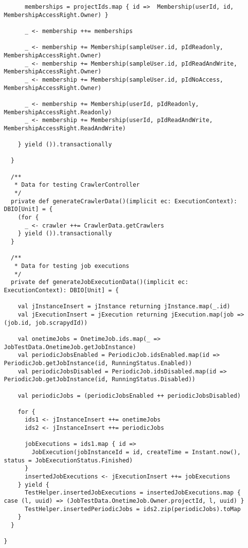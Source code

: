 \begin{lstlisting}
      memberships = projectIds.map { id =>  Membership(userId, id, MembershipAccessRight.Owner) }

      _ <- membership ++= memberships

      _ <- membership += Membership(sampleUser.id, pIdReadonly, MembershipAccessRight.Owner)
      _ <- membership += Membership(sampleUser.id, pIdReadAndWrite, MembershipAccessRight.Owner)
      _ <- membership += Membership(sampleUser.id, pIdNoAccess, MembershipAccessRight.Owner)

      _ <- membership += Membership(userId, pIdReadonly, MembershipAccessRight.Readonly)
      _ <- membership += Membership(userId, pIdReadAndWrite, MembershipAccessRight.ReadAndWrite)

    } yield ()).transactionally

  }

  /**
   * Data for testing CrawlerController
   */
  private def generateCrawlerData()(implicit ec: ExecutionContext): DBIO[Unit] = {
    (for {
      _ <- crawler ++= CrawlerData.getCrawlers
    } yield ()).transactionally
  }

  /**
   * Data for testing job executions
   */
  private def generateJobExecutionData()(implicit ec: ExecutionContext): DBIO[Unit] = {

    val jInstanceInsert = jInstance returning jInstance.map(_.id)
    val jExecutionInsert = jExecution returning jExecution.map(job => (job.id, job.scrapydId))

    val onetimeJobs = OnetimeJob.ids.map(_ => JobTestData.OnetimeJob.getJobInstance)
    val periodicJobsEnabled = PeriodicJob.idsEnabled.map(id => PeriodicJob.getJobInstance(id, RunningStatus.Enabled))
    val periodicJobsDisabled = PeriodicJob.idsDisabled.map(id => PeriodicJob.getJobInstance(id, RunningStatus.Disabled))

    val periodicJobs = (periodicJobsEnabled ++ periodicJobsDisabled)

    for {
      ids1 <- jInstanceInsert ++= onetimeJobs
      ids2 <- jInstanceInsert ++= periodicJobs

      jobExecutions = ids1.map { id =>
        JobExecution(jobInstanceId = id, createTime = Instant.now(), status = JobExecutionStatus.Finished)
      }
      insertedJobExecutions <- jExecutionInsert ++= jobExecutions
    } yield {
      TestHelper.insertedJobExecutions = insertedJobExecutions.map { case (l, uuid) => (JobTestData.OnetimeJob.Owner.projectId, l, uuid) }
      TestHelper.insertedPeriodicJobs = ids2.zip(periodicJobs).toMap
    }
  }

}
\end{lstlisting}
